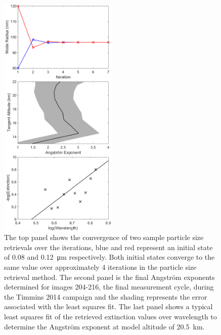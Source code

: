\documentclass[12pt]{article}
\begin{document}
\begin{figure}
\includegraphics[width=0.5\textwidth]{./Images/5-4-ParticalSize.pdf}
    \caption{The top panel shows the convergence of two sample particle size retrievals over the iterations, blue and red represent an initial state of 0.08 and
0.12~\si{\micro\metre} respectively. Both initial states converge to the same value over approximately 4 iterations in the particle size retrieval method. The second panel
is the final Angstr\"{o}m exponents determined for images 204-216, the final measurement cycle, during the Timmins 2014 campaign and the shading represents the error associated with the least squares fit. The last panel shows a typical least squares fit of the retrieved extinction values over wavelength to determine the Angstr\"{o}m exponent at model altitude of 20.5~km.}
    \label{fig:ParticleSize}
\end{figure}
\end{document}
